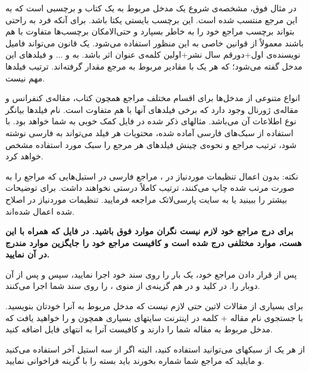 در مثال فوق،  مشخصه‌ی شروع یک مدخل مربوط به یک کتاب و  برچسبی است که به این مرجع منتسب شده است.
 این برچسب بایستی یکتا باشد. برای آنکه فرد به راحتی بتواند برچسب مراجع خود را به خاطر بسپارد و حتی‌الامکان برچسب‌ها متفاوت با هم باشند معمولاً از قوانین خاصی به این منظور استفاده می‌شود. یک قانون می‌تواند فامیل نویسنده‌ی اول+دورقم سال نشر+اولین کلمه‌ی عنوان اثر باشد. به  و $\dots$ و  فیلدهای این مدخل گفته می‌شود؛ که هر یک با مقادیر مربوط به مرجع مقدار گرفته‌اند. ترتیب فیلدها مهم نیست. 

انواع متنوعی از مدخل‌ها برای اقسام مختلف مراجع همچون کتاب، مقاله‌ی کنفرانس و مقاله‌ی ژورنال وجود دارد که برخی فیلدهای آنها با هم متفاوت است. 
نام فیلدها بیانگر نوع اطلاعات آن می‌باشد. مثالهای ذکر شده در فایل  کمک خوبی به شما خواهد بود. 
با استفاده از سبک‌های فارسی آماده شده، محتویات هر فیلد می‌تواند به فارسی نوشته شود، ترتیب مراجع و نحوه‌ی چینش فیلدهای هر مرجع را سبک مورد استفاده  مشخص خواهد کرد.

نکته: بدون اعمال تنظیمات موردنیاز  در ، مراجع فارسی در استیل‌هایی که مراجع را به صورت مرتب شده چاپ می‌کنند، ترتیب کاملاً درستی نخواهند داشت. برای توضیحات بیشتر \cite{persianbib87userguide} را ببینید یا به سایت پارسی‌لاتک مراجعه فرمایید. تنظیمات موردنیاز در  اصلاح شده اعمال شده‌اند.

\textbf{برای درج مراجع خود لازم نیست نگران موارد فوق باشید. در فایل 
 که همراه با این \پ هست، موارد مختلفی درج شده است و کافیست مراجع خود را جایگزین موارد مندرج در آن نمایید.
}

پس از قرار دادن مراجع خود، یک بار  را روی سند خود اجرا نمایید، سپس  و پس از آن دوبار  را. در  کلید  و در  هم گزینه‌ی  از منوی ،  را روی سند شما اجرا می‌کنند.

برای بسیاری از مقالات لاتین حتی لازم نیست که مدخل مربوط به آنرا خودتان بنویسید. با جستجوی نام مقاله + کلمه   در اینترنت سایتهای بسیاری همچون  و  را خواهید یافت که مدخل  مربوط به مقاله شما را دارند و کافیست آنرا به انتهای فایل  اضافه کنید.

از هر یک از سبکهای  می‌توانید استفاده کنید، البته اگر از سه استیل آخر استفاده می‌کنید و مایلید که مراجع شما شماره بخورند باید بسته  را با گزینه  فراخوانی نمایید.
